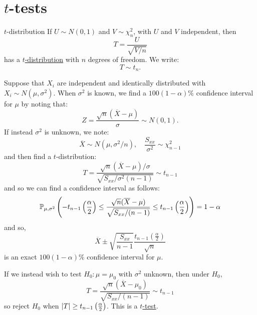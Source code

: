 \documentclass[../Main.tex]{subfiles}
\begin{document}
\section{\texorpdfstring{$t$}{T}-tests}
\begin{definition}{$t$-distribution}
    If $U \sim N(0, 1)$ and $V \sim \chi_n^2$, with $U$ and $V$ independent, then
    \begin{equation*}
        T = \frac{U}{\sqrt{V / n}}
    \end{equation*} has a \underline{$t$-distribution} with $n$ degrees of freedom. We write:
    \begin{equation*}
        T \sim t_n.
    \end{equation*}
\end{definition}
\begin{example}
    Suppose that $X_i$ are independent and identically distributed with $X_i \sim N(\mu, \sigma^2)$. When $\sigma^2$ is known, we find a $100(1-\alpha)\%$ confidence interval for $\mu$ by noting that:
    \begin{equation*}
        Z = \frac{\sqrt{n}(\overline{X} - \mu)}{\sigma} \sim N(0, 1).
    \end{equation*}
    If instead $\sigma^2$ is unknown, we note:
    \begin{equation*}
        \overline{X} \sim N(\mu, \sigma^2 / n),\quad \frac{S_{xx}}{\sigma^2} \sim \chi_{n-1}^2
    \end{equation*}
    and then find a $t$-distribution:
    \begin{equation*}
        T = \frac{\sqrt{n}(\overline{X} - \mu) / \sigma}{\sqrt{S_{xx} / \sigma^2(n-1)}} \sim t_{n-1}
    \end{equation*}
    and so we can find a confidence interval as follows:
    \begin{equation*}
        \P_{\mu, \sigma^2} \left(-t_{n-1}\left(\frac{\alpha}{2}\right) \leq \frac{\sqrt{n} (\overline{X} - \mu)}{\sqrt{S_{xx} / (n-1)}} \leq t_{n-1} \left(\frac{\alpha}{2}\right)\right) = 1- \alpha
    \end{equation*}
    and so,
    \begin{equation*}
        \overline{X} \pm \sqrt{\frac{S_{xx}}{n-1}} \frac{t_{n-1}\left(\frac{\alpha}{2}\right)}{\sqrt{n}}
    \end{equation*}
    is an exact $100(1-\alpha)\%$ confidence interval for $\mu$.

    If we instead wish to test $H_0 : \mu = \mu_0$ with $\sigma^2$ unknown, then under $H_0$,
    \begin{equation*}
        T = \frac{\sqrt{n}(\overline{X} - \mu_0)}{\sqrt{S_{xx} / (n-1)}} \sim t_{n-1}
    \end{equation*}
    so reject $H_0$ when $\abs{T} \geq t_{n-1}\left(\frac{\alpha}{2}\right)$. This is a \underline{$t$-test}.
\end{example}
\end{document}
